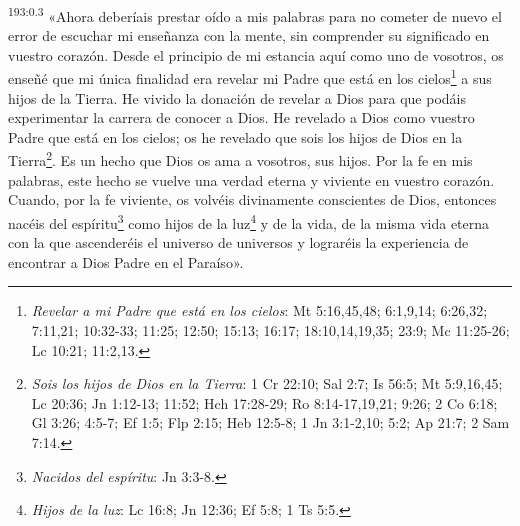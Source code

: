 \par
\textsuperscript{193:0.3} «Ahora deberíais prestar oído a mis palabras para no cometer de nuevo el error de escuchar mi enseñanza con la mente, sin comprender su significado en vuestro corazón. Desde el principio de mi estancia aquí como uno de vosotros, os enseñé que mi única finalidad era revelar mi Padre que está en los cielos\footnote{\textit{Revelar a mi Padre que está en los cielos}: Mt 5:16,45,48; 6:1,9,14; 6:26,32; 7:11,21; 10:32-33; 11:25; 12:50; 15:13; 16:17; 18:10,14,19,35; 23:9; Mc 11:25-26; Lc 10:21; 11:2,13.} a sus hijos de la Tierra. He vivido la donación de revelar a Dios para que podáis experimentar la carrera de conocer a Dios. He revelado a Dios como vuestro Padre que está en los cielos; os he revelado que sois los hijos de Dios en la Tierra\footnote{\textit{Sois los hijos de Dios en la Tierra}: 1 Cr 22:10; Sal 2:7; Is 56:5; Mt 5:9,16,45; Lc 20:36; Jn 1:12-13; 11:52; Hch 17:28-29; Ro 8:14-17,19,21; 9:26; 2 Co 6:18; Gl 3:26; 4:5-7; Ef 1:5; Flp 2:15; Heb 12:5-8; 1 Jn 3:1-2,10; 5:2; Ap 21:7; 2 Sam 7:14.}. Es un hecho que Dios os ama a vosotros, sus hijos. Por la fe en mis palabras, este hecho se vuelve una verdad eterna y viviente en vuestro corazón. Cuando, por la fe viviente, os volvéis divinamente conscientes de Dios, entonces nacéis del espíritu\footnote{\textit{Nacidos del espíritu}: Jn 3:3-8.} como hijos de la luz\footnote{\textit{Hijos de la luz}: Lc 16:8; Jn 12:36; Ef 5:8; 1 Ts 5:5.} y de la vida, de la misma vida eterna con la que ascenderéis el universo de universos y lograréis la experiencia de encontrar a Dios Padre en el Paraíso».


